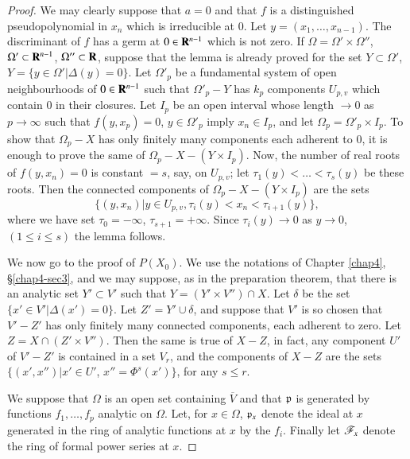 \begin{proof}
We may clearly suppose that $a=0$ and that $f$ is a distinguished pseudopolynomial in $x_{n}$ which is irreducible at $0$. Let $y=(x_{1},\ldots,x_{n-1})$. The discriminant of $f$ has a germ at $0\in \mathbf{R}^{n-1}$ which is not zero. If $\Omega=\Omega'\times \Omega''$, $\Omega'\subset \mathbf{R}^{n-1}$, $\Omega''\subset \mathbf{R}$, suppose that the lemma is already proved for the set $Y\subset \Omega'$, $Y=\{y\in \Omega'|\Delta (y)=0\}$. Let $\Omega'_{p}$ be a fundamental system of open neighbourhoods of $0\in \mathbf{R}^{n-1}$ such that $\Omega'_{p}-Y$ has $k_{p}$ components $U_{p,v}$ which contain $0$ in their closures. Let $I_{p}$ be an open interval whose length $\to 0$ as $p\to \infty$ such that $f(y,x_{p})=0$, $y\in \Omega'_{p}$ imply $x_{n}\in I_{p}$, and let $\Omega_{p}=\Omega'_{p}\times I_{p}$. To show that $\Omega_{p}-X$ has only finitely many components each adherent to $0$, it is enough to prove the same of $\Omega_{p}-X-(Y\times I_{p})$. Now, the number of real roots of $f(y,x_{n})=0$ is constant $=s$, say, on $U_{p,v}$; let $\tau_{1}(y)<\ldots<\tau_{s}(y)$ be these roots. Then the connected components of $\Omega_{p}-X-(Y\times I_{p})$ are the sets
$$
\{(y,x_{n})|y\in U_{p,v},\tau_{i}(y)<x_{n}<\tau_{i+1}(y)\},
$$
where we have set $\tau_{0}=-\infty$, $\tau_{s+1}=+\infty$. Since $\tau_{i}(y)\to 0$ as $y\to 0$, $(1\leq i\leq s)$ the lemma follows.

We now go to the proof of $P(X_{0})$. We use the notations of Chapter \ref{chap4}, \S\ref{chap4-sec3}, and we may suppose, as in the preparation theorem, that there is an analytic set $Y'\subset V'$ such that $Y=(Y'\times V'')\cap X$. Let $\delta$ be the set $\{x'\in V'|\Delta(x')=0\}$. Let $Z'=Y'\cup \delta$, and suppose that $V'$ is so chosen that $V'-Z'$ has only finitely many connected components, each adherent to zero. Let $Z=X\cap (Z'\times V'')$. Then the same is true of $X-Z$, in fact, any component $U'$ of $V'-Z'$ is contained in a set $V_{r}$, and the components of $X-Z$ are the sets $\{(x',x'')|x'\in U'$, $x''=\Phi^{s}(x')\}$, for any $s\leq r$.

We suppose that $\Omega$ is an open set containing $\overline{V}$ and that $\mathfrak{p}$ is generated by functions $f_{1},\ldots,f_{p}$ analytic on $\Omega$. Let, for $x\in \Omega$, $\mathfrak{p}_{x}$ denote the ideal at $x$ generated in the ring of analytic functions at $x$ by the $f_{i}$. Finally let $\mathscr{F}_{x}$ denote the ring of formal power series at $x$.
\end{proof}


